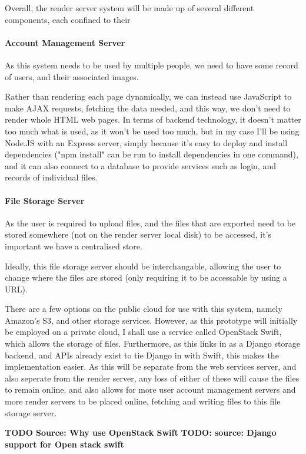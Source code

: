 \documentclass[12pt,a4paper]{article}
\begin{document}
Overall, the render server system will be made up of several different components, each
confined to their
\paragraph{Account Management Server}
As this system needs to be used by multiple people, we need to have some record of users,
and their associated images.

Rather than rendering each page dynamically, we can instead use JavaScript to make AJAX requests,
fetching the data needed, and this way, we don't need to render whole HTML web pages. In terms of
backend technology, it doesn't matter too much what is used, as it won't be used too much, but
in my case I'll be using Node.JS with an Express server, simply because it's easy to deploy and
install dependencies ("npm install" can be run to install dependencies in one command), and it can
also connect to a database to provide services such as login, and records of individual files.

\paragraph{File Storage Server}
As the user is required to upload files, and the files that are exported need to be stored
somewhere (not on the render server local disk) to be accessed, it's important we have a
centralised store.

Ideally, this file storage server should be interchangable, allowing the user to change
where the files are stored (only requiring it to be accessable by using a URL).

There are a few options on the public cloud for use with this system, namely Amazon's S3,
and other storage services. However, as this prototype will initially be employed on a
private cloud, I shall use a service called OpenStack Swift, which allows the storage of files.
Furthermore, as this links in as a Django storage backend, and APIs already exist to tie Django in
with Swift, this makes the implementation easier. As this will be separate from the web services server,
and also seperate from the render server, any loss of either of these will cause the files to remain online,
and also allows for more user account management servers and more render servers to be placed online,
fetching and writing files to this file storage server.

\textbf{TODO Source: Why use OpenStack Swift}
\textbf{TODO: source: Django support for Open stack swift}
\end{document}
